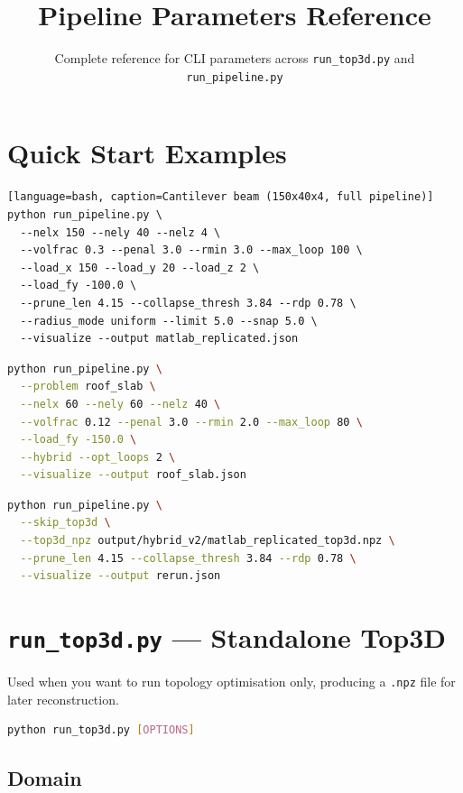 \documentclass[11pt,a4paper]{article}
\title{\textbf{\Huge Pipeline Parameters Reference}}
\author{Complete reference for CLI parameters across \texttt{run\_top3d.py} and \texttt{run\_pipeline.py}}
\date{}
\begin{document}
\maketitle
\tableofcontents
\newpage

\section{Quick Start Examples}

\begin{lstlisting}[language=bash, caption=Cantilever beam (150x40x4, full pipeline)]
python run_pipeline.py \
  --nelx 150 --nely 40 --nelz 4 \
  --volfrac 0.3 --penal 3.0 --rmin 3.0 --max_loop 100 \
  --load_x 150 --load_y 20 --load_z 2 \
  --load_fy -100.0 \
  --prune_len 4.15 --collapse_thresh 3.84 --rdp 0.78 \
  --radius_mode uniform --limit 5.0 --snap 5.0 \
  --visualize --output matlab_replicated.json
\end{lstlisting}

\begin{lstlisting}[language=bash, caption=Roof slab with interior columns (hybrid beam+plate)]
python run_pipeline.py \
  --problem roof_slab \
  --nelx 60 --nely 60 --nelz 40 \
  --volfrac 0.12 --penal 3.0 --rmin 2.0 --max_loop 80 \
  --load_fy -150.0 \
  --hybrid --opt_loops 2 \
  --visualize --output roof_slab.json
\end{lstlisting}

\begin{lstlisting}[language=bash, caption=Skip Top3D (reuse existing NPZ)]
python run_pipeline.py \
  --skip_top3d \
  --top3d_npz output/hybrid_v2/matlab_replicated_top3d.npz \
  --prune_len 4.15 --collapse_thresh 3.84 --rdp 0.78 \
  --visualize --output rerun.json
\end{lstlisting}

\section{\texttt{run\_top3d.py} — Standalone Top3D}

Used when you want to run topology optimisation only, producing a \texttt{.npz} file for later reconstruction.

\begin{lstlisting}[language=bash]
python run_top3d.py [OPTIONS]
\end{lstlisting}

\subsection{Domain}
\end{document}
